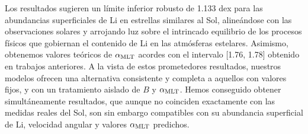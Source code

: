 Los resultados sugieren un límite inferior robusto de 1.133 dex para las abundancias superficiales de Li en estrellas similares al Sol, alineándose con las observaciones solares y arrojando luz sobre el intrincado equilibrio de los procesos físicos que gobiernan el contenido de Li en las atmósferas estelares. Asimismo, obtenemos valores teóricos de $\alpha_{\mathrm{MLT}}$ acordes con el intervalo [1.76, 1.78] obtenido en trabajos anteriores. A la vista de estos prometedores resultados, nuestros modelos ofrecen una alternativa consistente y completa a aquellos con valores fijos, y con un tratamiento aislado de $B$ y $\alpha_{\mathrm{MLT}}$. Hemos conseguido obtener simultáneamente resultados, que aunque no coinciden exactamente con las medidas reales del Sol, son sin embargo compatibles con su abundancia superficial de Li, velocidad angular y valores $\alpha_{\mathrm{MLT}}$ predichos.\par

\endinput
